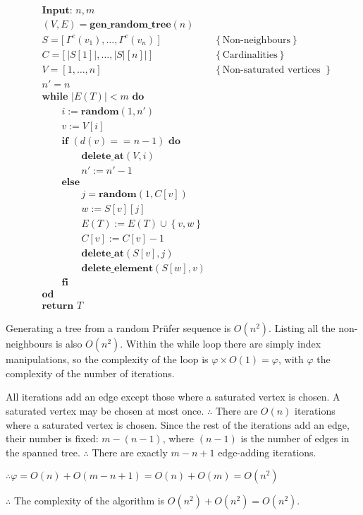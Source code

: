 \documentclass[a4paper, 12pt]{article}
\begin{document}
\begin{align*}
    &\textbf{Input: } n, m\\
    &(V, E) = \textbf{gen\_random\_tree}(n)\\
    &S = \big[~\Gamma^c(v_1), \ldots, \Gamma^c(v_n)~\big] &\left\{ \text{Non-neighbours} \right\} \\
    &C = \big[~ |S[1]|, \ldots, |S|[n]|~\big] & \left\{ \text{Cardinalities} \right\} \\
    &V = [1, \ldots, n] &\left\{ \text{Non-saturated vertices } \right\} \\
    &n' = n\\
    &\textbf{while } |E(T)| < m \textbf{ do } \\ 
    &\qquad i := \textbf{random}(1, n') \\ 
    &\qquad v := V[i]\\
    &\qquad \textbf{if } \left( d(v) == n - 1 \right) \textbf{ do } \\ 
    &\qquad \qquad \textbf{delete\_at}(V, i)\\ 
    &\qquad\qquad n' := n' - 1 \\ 
    &\qquad\textbf{else } \\ 
    &\qquad\qquad j = \textbf{random}(1, C[v])\\
    &\qquad\qquad w := S[v][j] \\ 
    &\qquad\qquad E(T) := E(T) \cup  \left\{ v, w \right\} \\
    &\qquad\qquad C[v] := C[v] - 1 \\ 
    &\qquad\qquad \textbf{delete\_at}(S[v], j)  \\ 
    &\qquad\qquad\textbf{delete\_element}(S[w], v)\\ 
    &\qquad\textbf{fi}\\
    &\textbf{od}\\
    &\textbf{return } T
\end{align*}

Generating a tree from a random Prüfer sequence is $O(n^2)$. Listing all the
non-neighbours is also $O(n^2)$. Within the while loop there are simply index
manipulations, so the complexity of the loop is $\varphi \times O(1) =
\varphi$, with $\varphi$ the complexity of the number of iterations. 

All iterations add an edge except those where a saturated vertex is chosen. A
saturated vertex may be chosen at most once. $\therefore $ There are $O(n)$
iterations where a saturated vertex is chosen. Since the rest of the 
iterations add an edge, their number is fixed: $m - (n-1)$, where $(n-1)$ is the number of 
edges in the spanned tree. $\therefore $ There are exactly $m -n + 1$ edge-adding
iterations.

$\therefore  \varphi = O(n) + O(m - n + 1) = O(n) + O(m) = O(n^2)$

$\therefore $ The complexity of the algorithm is $O(n^2) + O(n^2) = O(n^2)$.
\end{document}
